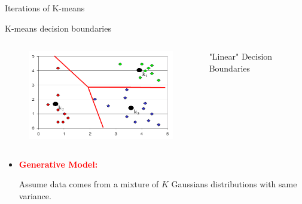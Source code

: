 \documentclass[11.5pt]{beamer}
\begin{document}
\begin{frame}{Iterations of K-means}
\begin{figure}
\end{figure}
\end{frame}

\begin{frame}{K-means decision boundaries}
\begin{columns}[c]
\column{8cm}
\begin{figure}
\includegraphics[width=7cm]{pics/kmean_decision_boundaries}
\end{figure}
\column{3cm}
"Linear" Decision Boundaries
\end{columns}
\begin{itemize}
	\item \textbf{\textcolor{red}{Generative Model:}}

	Assume data comes from a mixture of $K$ Gaussians distributions
	with same variance.
\end{itemize}
\end{frame}
\end{document}
